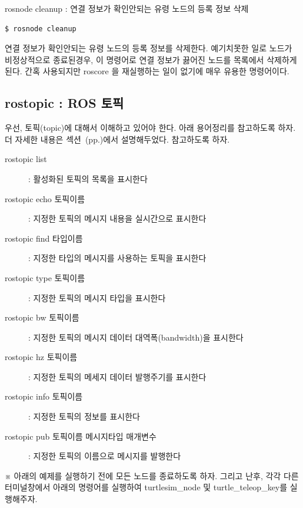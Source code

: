 \noindent
{}\circled{\thenum} rosnode cleanup : 연결 정보가 확인안되는 유령 노드의 등록 정보 삭제
\begin{lstlisting}[language=ROS]
$ rosnode cleanup 
\end{lstlisting}

\noindent
연결 정보가 확인안되는 유령 노드의 등록 정보를 삭제한다. 예기치못한 일로 노드가 비정상적으로 종료된경우, 이 명령어로 연결 정보가 끓어진 노드를 목록에서 삭제하게된다. 간혹 사용되지만 roscore 을 재실행하는 일이 없기에 매우 유용한 명령어이다.

\newpage
\subsection{rostopic : ROS 토픽}

우선, 토픽(topic)에 대해서 이해하고 있어야 한다. 아래 용어정리를 참고하도록 하자. 더 자세한 내용은 섹션~(pp.\pageref{def:RosTopic})에서 설명해두었다. 참고하도록 하자.

\vspace{\baselineskip}
\noindent
\begin{description}
\item[rostopic list] : 활성화된 토픽의 목록을 표시한다
\item[rostopic echo 토픽이름] : 지정한 토픽의 메시지 내용을 실시간으로 표시한다
\item[rostopic find 타입이름] : 지정한 타입의 메시지를 사용하는 토픽을 표시한다
\item[rostopic type 토픽이름] : 지정한 토픽의 메시지 타입을 표시한다
\item[rostopic bw 토픽이름] : 지정한 토픽의 메시지 데이터 대역폭(bandwidth)을 표시한다
\item[rostopic hz 토픽이름] : 지정한 토픽의 메세지 데이터 발행주기를 표시한다
\item[rostopic info 토픽이름] : 지정한 토픽의 정보를 표시한다
\item[rostopic pub 토픽이름 메시지타입 매개변수] : 지정한 토픽의 이름으로 메시지를 발행한다
\end{description}

\vspace{\baselineskip}
\noindent
※ 아래의 예제를 실행하기 전에 모든 노드를 종료하도록 하자. 그리고 난후, 각각 다른 터미널창에서 아래의 명령어를 실행하여 turtlesim\_node 및 turtle\_teleop\_key를 실행해주자.

